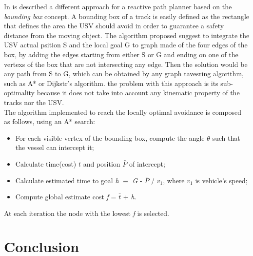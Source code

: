 \documentclass[journal]{IEEEtran}
\begin{document}
  \indent In \cite{Casalino2009} is described a different approach for a reactive path planner based on the \textit{bounding box} concept. A bounding box of a track is easily defined as the rectangle that defines the area the USV should avoid in order to guarantee a safety distance from the moving object. The algorithm proposed suggest to integrate the USV actual psition S and the local goal G to  graph made of the four edges of the box, by adding the edges starting from either S or G and ending on one of the vertexs of the box that are not intersecting any edge. Then the solution would be any path from S to G, which can be obtained by any graph tavesring algorithm, such as A* or Dijkstr's algorithm. the problem with this approach is its sub-optimality because it does not take into account any kinematic property of the tracks nor the USV.\\
  The algorithm implemented to reach the locally optimal avoidance is composed as follows, using an A* search:
  \begin{itemize}
        \item For each visible vertex of the bounding box, compute the angle $\theta$ such that the vessel can intercept it;
        \item Calculate time(cost) \textit{$\bar{t}$} and position $\bar{P}$ of intercept;
        \item Calculate estimated time to goal \textit{h} $\equiv$ \textit{G} - \textit{$\bar{P}$} / \textit{$v_1$}, where \textit{$v_1$} is vehicle's speed;
        \item Compute global estimate cost \textit{f} = \textit{$\bar{t}$} + \textit{h}.
  \end{itemize}
  At each iteration the node with the lowest \textit{f} is selected.

\section{Conclusion} \label{conclusion}



\ifCLASSOPTIONcaptionsoff
  \newpage
\fi


%
%
%







\end{document}
